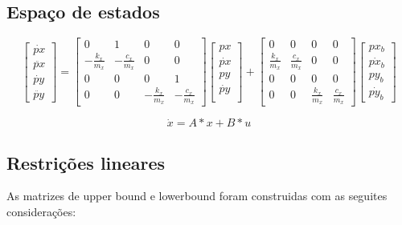 \subsection{Espaço de estados}
\begin{equation}
    \label{eq:espaco_de_estados_din_model}
    \begin{bmatrix}
        \dot{px} \\
        \ddot{px} \\
        \dot{py} \\
        \ddot{py}
    \end{bmatrix}
    =
    \begin{bmatrix}
        0 & 1 & 0 & 0 \\
        -\frac{k_x}{m_x} & -\frac{c_x}{m_x} & 0 & 0 \\
        0 & 0 & 0 & 1 \\
        0 & 0 & -\frac{k_x}{m_x} & -\frac{c_x}{m_x}
    \end{bmatrix}
    \begin{bmatrix}
        px \\
        \dot{px} \\        
        py \\
        \dot{py} \\
    \end{bmatrix}
    +
    \begin{bmatrix}
        0 & 0 & 0 & 0 \\
        \frac{k_x}{m_x} & \frac{c_x}{m_x} & 0 & 0 \\
        0 & 0 & 0 & 0 \\
        0 & 0 & \frac{k_x}{m_x} & \frac{c_x}{m_x}
    \end{bmatrix}
    \begin{bmatrix}
        px_b \\
        \dot{px_b}  \\
        py_b \\
        \dot{py_b} 
    \end{bmatrix}
\end{equation}


\begin{equation}
    \label{eq:simp_state_space_din_model}
    \dot x = A*x+B*u
\end{equation}


\subsection{Restrições lineares}
As matrizes de upper bound e lowerbound foram construidas com as seguites considerações:


